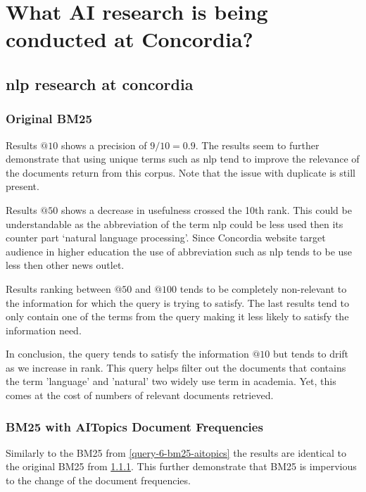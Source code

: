 \section{What AI research is being conducted at Concordia?}

\subsection{nlp research at concordia}\label{query-7}

\subsubsection{Original BM25}\label{query-7-bm25}

\par Results $@10$ shows a precision of $9/10=0.9$. The results seem to further demonstrate that using unique terms such as nlp tend to improve the relevance of the documents return from this corpus. Note that the issue with duplicate is still present.
\par Results $@50$ shows a decrease in usefulness crossed the 10th rank. This could be understandable as the abbreviation of the term nlp could be less used then its counter part `natural language processing'. Since Concordia website target audience in higher education the use of abbreviation such as nlp tends to be use less then other news outlet.
\par Results ranking between $@50$ and $@100$ tends to be completely non-relevant to the information for which the query is trying to satisfy. The last results tend to only contain one of the terms from the query making it less likely to satisfy the information need. 
\par In conclusion, the query tends to satisfy the information $@10$ but tends to drift as we increase in rank. This query helps filter out the documents that contains the term 'language' and 'natural' two widely use term in academia. Yet, this comes at the cost of numbers of relevant documents retrieved.

\subsubsection{BM25 with AITopics Document Frequencies}\label{query-7-bm25-aitopics}

\par Similarly to the BM25 from \ref{query-6-bm25-aitopics} the results are identical to the original BM25 from \ref{query-7-bm25}. This further demonstrate that BM25 is impervious to the change of the document frequencies.

